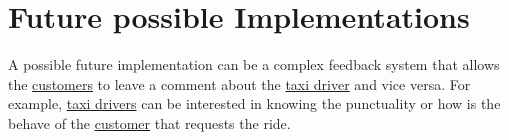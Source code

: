 	\section{Future possible Implementations}
	A possible future implementation can be a complex feedback system that allows the \hyperref[sec:customer]{customers} to leave a comment about the \hyperref[sec:tdriver]{taxi driver} and vice versa.
	For example, \hyperref[sec:tdriver]{taxi drivers} can be interested in knowing the punctuality or how is the behave of the \hyperref[sec:customer]{customer} that requests the ride.